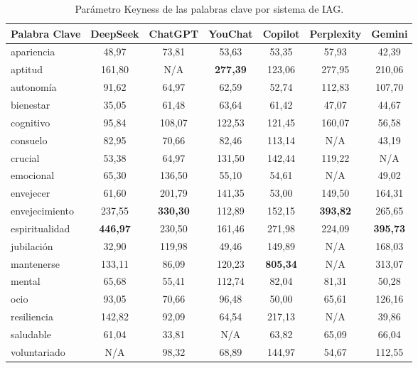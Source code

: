 \documentclass[spanish]{textolivre}
\begin{document}
\begin{table}[htbp]
\centering
\begin{threeparttable}
\caption{Parámetro Keyness de las palabras clave por sistema de IAG.}\label{tab-7}
\begin{tabular}{lcccccc}
\toprule
Palabra Clave & DeepSeek & ChatGPT & YouChat & Copilot & Perplexity & Gemini \\
\midrule
apariencia & 48,97 & 73,81 & 53,63 & 53,35 & 57,93 & 42,39 \\
aptitud & 161,80 & N/A & \textbf{277,39} & 123,06 & 277,95 & 210,06 \\
autonomía & 91,62 & 64,97 & 62,59 & 52,74 & 112,83 & 107,70 \\
bienestar & 35,05 & 61,48 & 63,64 & 61,42 & 47,07 & 44,67 \\
cognitivo & 95,84 & 108,07 & 122,53 & 121,45 & 160,07 & 56,58 \\
consuelo & 82,95 & 70,66 & 82,46 & 113,14 & N/A & 43,19 \\
crucial & 53,38 & 64,97 & 131,50 & 142,44 & 119,22 & N/A \\
emocional & 65,30 & 136,50 & 55,10 & 54,61 & N/A & 49,02 \\
envejecer & 61,60 & 201,79 & 141,35 & 53,00 & 149,50 & 164,31 \\
envejecimiento & 237,55 & \textbf{330,30} & 112,89 & 152,15 & \textbf{393,82} & 265,65 \\
espiritualidad & \textbf{446,97} & 230,50 & 161,46 & 271,98 & 224,09 & \textbf{395,73} \\
jubilación & 32,90 & 119,98 & 49,46 & 149,89 & N/A & 168,03 \\
mantenerse & 133,11 & 86,09 & 120,23 & \textbf{805,34} & N/A & 313,07 \\
mental & 65,68 & 55,41 & 112,74 & 82,04 & 81,31 & 50,28 \\
ocio & 93,05 & 70,66 & 96,48 & 50,00 & 65,61 & 126,16 \\
resiliencia & 142,82 & 92,09 & 64,54 & 217,13 & N/A & 39,86 \\
saludable & 61,04 & 33,81 & N/A & 63,82 & 65,09 & 66,04 \\
voluntariado & N/A & 98,32 & 68,89 & 144,97 & 54,67 & 112,55 \\
\bottomrule
\end{tabular}
\end{threeparttable}
\end{table}
\end{document}

